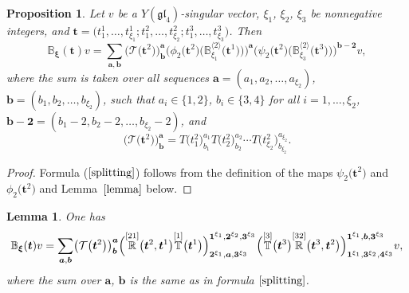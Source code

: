 \documentclass[pdftex]{sigma}
\numberwithin{equation}{section}
\newtheorem{Lemma}[Theorem]{Lemma}
\newtheorem{Proposition}[Theorem]{Proposition}
 { \theoremstyle{definition}
\newtheorem{Definition}[Theorem]{Definition}
\newtheorem*{Example}{Example}
\newtheorem*{Remark}{Remark} }
\newcommand\ltwo{\langle 2\rangle}
\begin{document}
\begin{Proposition}Let $v$ be a $Y(\mathfrak{g l}_{4})$-singular vector, $\xi_1$, $\xi_2$, $\xi_3$ be nonnegative integers, and
$\boldsymbol{t}=\bigl(t^1_1,\dots,t^1_{\xi_1};t^2_1,\dots,t^2_{\xi_2};t^3_1,\dots,t^3_{\xi_3}\bigr)$. Then
\label{propsplitting}
\begin{equation}\label{splitting}
\mathbb{B}_{\boldsymbol{\xi}}(\boldsymbol{t})v =
\sum_{\boldsymbol{a},\boldsymbol{b}} \bigl(\mathcal{T}\bigl(\boldsymbol{t}^{2}\bigr)\bigr)^{\boldsymbol{a}}_{\boldsymbol{b}}
\bigl(\phi_2\bigl(\boldsymbol{t}^ 2\bigr)\bigl(\mathbb{B}_{\xi_1}^{\ltwo}\bigl(\boldsymbol{t}^{1}\bigr)\bigr)\bigr)^{\boldsymbol{a}}
\bigl(\psi_2\bigl(\boldsymbol{t}^{2}\bigr)\bigl(\mathbb{B}_{\xi_3}^{\ltwo}\bigl(\boldsymbol{t}^{ 3}\bigr)\bigr)\bigr)^{\boldsymbol{b-2}} v,
\end{equation}
where the sum is taken over all sequences $\boldsymbol{a}=(a_1,a_2,\dots,a_{\xi_2})$, $\boldsymbol{b}=(b_1,b_2,\dots,b_{\xi_2})$, such that $a_i\in \{1,2\}$, $b_i\in \{3,4\}$ for all $i=1,\dots,\xi_2$, $\boldsymbol{b-2}=(b_1-2,b_2-2,\dots,b_{\xi_2}-2)$, and
\begin{equation*}
\bigl( \mathcal{T}\bigl(\boldsymbol{t}^2\bigr)\bigr)^{\boldsymbol{a}}_{\boldsymbol{b}}=T\bigl(t^2_1\bigr)^{a_1}_{b_1}T\bigl(t^2_2\bigr)^{a_2}_{b_2}\cdots T\bigl(t^2_{\xi_2}\bigr)^{a_{\xi_2}}_{b_{\xi_2}}.
\end{equation*}
\end{Proposition}

\begin{proof}
Formula ($\ref{splitting}$) follows from the definition of the maps $\psi_2\bigl(\boldsymbol{t}^{2}\bigr)$ and $\phi_2\bigl(\boldsymbol{t}^{2}\bigr)$ and Lemma~$\ref{lemma}$ below.
\end{proof}

\begin{Lemma}\label{lemma} One has
\begin{equation*}%
\mathbb{B}_{\boldsymbol{\xi}}(\boldsymbol{t})v=
\sum_{\boldsymbol{a},\boldsymbol{b}} \bigl( \mathcal{T}\bigl(\boldsymbol{t}^{ 2}\bigr) \bigr)^{\boldsymbol{a}}_{\boldsymbol{b}} \Bigl( \overset{[21]}{\mathbb{R}}\bigl(\boldsymbol{t}^{ 2},\boldsymbol{t}^{ 1}\bigr) \overset{[1]}{\mathbb{T}}\bigl(\boldsymbol{t}^{ 1}\bigr) \Bigr)^{\boldsymbol{1}^{\xi_1}, \boldsymbol{2}^{\xi_2}, \boldsymbol{3}^{\xi_3}}_{\boldsymbol{2}^{\xi_1}, \boldsymbol{a}, \boldsymbol{3}^{\xi_3}} \Bigl( \overset{[3]}{\mathbb{T}}\bigl(\boldsymbol{t}^{ 3}\bigr) \overset{[32]}{\mathbb{R}}\bigl(\boldsymbol{t}^{ 3},\boldsymbol{t}^{ 2}\bigr) \Bigr)^{\boldsymbol{1}^{\xi_1}, \boldsymbol{b}, \boldsymbol{3}^{\xi_3}}_{\boldsymbol{1}^{\xi_1}, \boldsymbol{3}^{\xi_2}, \boldsymbol{4}^{\xi_3}}v,
\end{equation*}
where the sum over $\boldsymbol{a}$, $\boldsymbol{b}$ is the same as in formula $\eqref{splitting}$.
\end{Lemma}
\end{document}
